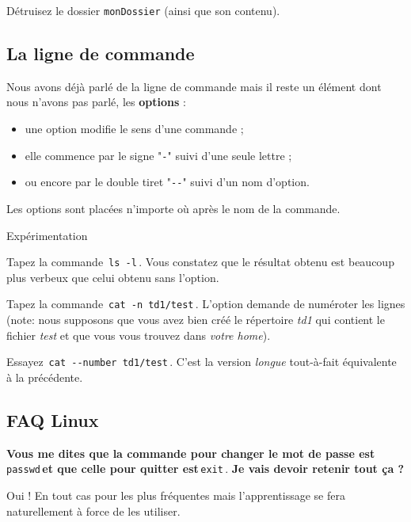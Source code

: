 \documentclass[a4paper,11pt]{article}
\begin{document}
\begin{Exercice}{}
D\'etruisez le dossier \verb_monDossier_ (ainsi que son contenu).
\end{Exercice}	

\subsection{La ligne de commande}
Nous avons d\'ej\`a parl\'e de la ligne de commande mais il reste un \'el\'ement dont nous n'avons pas parl\'e, les \textbf{options} :  
				
 \par
\begin{itemize}
\item une option modifie le sens d'une commande ;
\item elle commence par le signe "\verb|-|" suivi d'une seule lettre ;
\item ou encore par le double tiret "\verb|--|" suivi d'un nom d'option.
\end{itemize}
				
Les options sont plac\'ees n'importe o\`u apr\`es le nom de la commande.   
				
\par
        
			
\begin{Tutoriel}{Exp\'erimentation}		
\begin{steps}
\item Tapez la commande \,\verb|ls -l|\,. Vous constatez que le r\'esultat obtenu est beaucoup plus verbeux que celui obtenu sans l'option.
\item Tapez la commande \,\verb|cat -n td1/test|\,. L'option demande de num\'eroter les lignes (note: nous supposons que vous avez bien cr\'e\'e le r\'epertoire \textit{td1} qui contient le fichier \textit{test} et que vous vous trouvez dans \textit{votre home}).
\item Essayez \,\verb|cat --number td1/test|\,. C'est la version \textit{longue} tout-\`a-fait \'equivalente \`a la pr\'ec\'edente.
\end{steps}
\end{Tutoriel}
\subsection{FAQ Linux}
\textbf{Vous me dites que la commande pour changer le mot de passe est}\,\verb|passwd|\,\textbf{et que celle pour quitter est}\,\verb|exit|\,. \textbf{Je vais devoir retenir tout \c ca ?}
 \par
Oui ! En tout cas pour les plus fr\'equentes mais l'apprentissage se fera naturellement \`a force de les utiliser.
						
\end{document}
